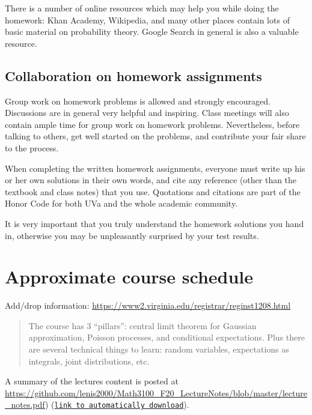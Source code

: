 \documentclass[oneside,11pt]{amsart}
\begin{document}
There is a number of online resources which may help you while doing the homework:
Khan Academy, Wikipedia, and many other 
places contain lots of basic material on probability theory. Google Search
in general
is also a valuable resource.

\subsection{Collaboration on homework assignments}
\label{collaboration}

Group work on homework problems is allowed and strongly encouraged.
Discussions are in general very
helpful and inspiring. Class meetings will also contain ample time
for group work on homework problems.
Nevertheless, before talking to others, get well started
on the problems, and contribute your fair share to the process. 

When completing the written homework assignments, everyone must write up his or her own
solutions in their own words, and cite any reference 
(other than the textbook and
class notes) that you use. Quotations and citations are part of the Honor Code for both UVa
and the whole academic community. 

It is very important that you truly understand the homework solutions you hand
in, otherwise you may be unpleasantly surprised by your test results.

\section{Approximate course schedule}

\noindent Add/drop information: \url{https://www2.virginia.edu/registrar/reginst1208.html}
\bigskip

\begin{quote}
	The course has 3 ``pillars'': central limit theorem for Gaussian approximation, 
	Poisson processes, and conditional expectations. 
	Plus there are several technical things to learn: random variables, expectations as integrals, 
	joint distributions, etc.
\end{quote}

\bigskip

A summary of the lectures content is posted at 
\url{https://github.com/lenis2000/Math3100_F20_LectureNotes/blob/master/lecture_notes.pdf})
(\href{https://raw.githubusercontent.com/lenis2000/Math3100_F20_LectureNotes/master/lecture_notes.pdf}
{\texttt{link to automatically download}}).
\end{document}
